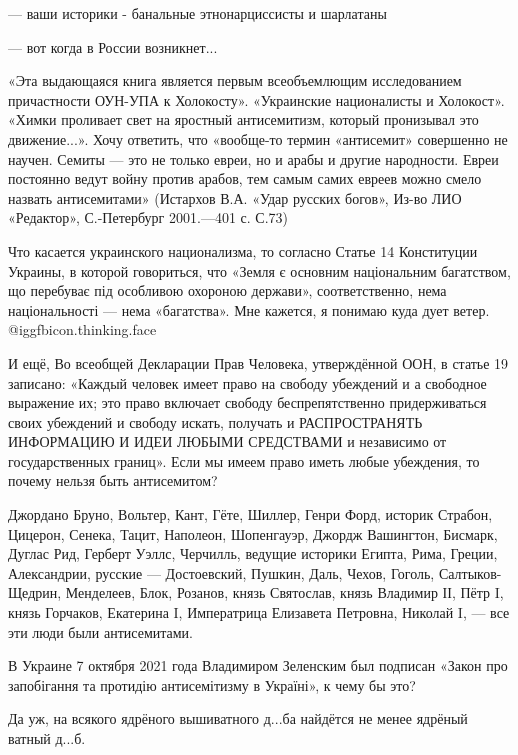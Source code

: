 \begin{itemize}
\begin{itemize}
— ваши историки - банальные этнонарциссисты и шарлатаны

— вот когда в России возникнет...


\end{itemize} %


«Эта выдающаяся книга является первым всеобъемлющим исследованием причастности
ОУН-УПА к Холокосту». «Украинские националисты и Холокост». «Химки проливает
свет на яростный антисемитизм, который пронизывал это движение...». Хочу
ответить, что «вообще-то термин «антисемит» совершенно не научен. Семиты — это
не только евреи, но и арабы и другие народности. Евреи постоянно ведут войну
против арабов, тем самым самих евреев можно смело назвать антисемитами»
(Истархов В.А. «Удар русских богов», Из-во ЛИО «Редактор», С.-Петербург
2001.—401 с. С.73)

Что касается украинского национализма, то согласно Статье 14 Конституции
Украины, в которой говориться, что «Земля є основним національним багатством,
що перебуває під особливою охороною держави», соответственно, нема
національності — нема «багатства». Мне кажется, я понимаю куда дует ветер.  @igg{fbicon.thinking.face} 

И ещё, Во всеобщей Декларации Прав Человека, утверждённой ООН, в статье 19
записано: «Каждый человек имеет право на свободу убеждений и а свободное
выражение их; это право включает свободу беспрепятственно придерживаться своих
убеждений и свободу искать, получать и РАСПРОСТРАНЯТЬ ИНФОРМАЦИЮ И ИДЕИ ЛЮБЫМИ
СРЕДСТВАМИ и независимо от государственных границ». Если мы имеем право иметь
любые убеждения, то почему нельзя быть антисемитом?

Джордано Бруно, Вольтер, Кант, Гёте, Шиллер, Генри Форд, историк Страбон,
Цицерон, Сенека, Тацит, Наполеон, Шопенгауэр, Джордж Вашингтон, Бисмарк, Дуглас
Рид, Герберт Уэллс, Черчилль, ведущие историки Египта, Рима, Греции,
Александрии, русские — Достоевский, Пушкин, Даль, Чехов, Гоголь,
Салтыков-Щедрин, Менделеев, Блок, Розанов, князь Святослав, князь Владимир ІІ,
Пётр I, князь Горчаков, Екатерина I, Императрица Елизавета Петровна, Николай I,
— все эти люди были антисемитами.

В Украине 7 октября 2021 года Владимиром Зеленским был подписан «Закон про
запобігання та протидію антисемітизму в Україні», к чему бы это?


Да уж, на всякого ядрёного вышиватного д...ба найдётся не менее ядрёный ватный д...б.


\end{itemize}
